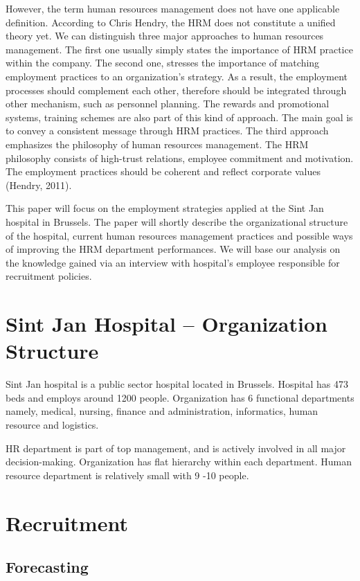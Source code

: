 \documentclass[a4paper,fleqn,11pt,dvips,titlepage]{article}
\numberwithin{figure}{section}
\numberwithin{equation}{section}
\begin{document}
However, the term human resources management does not have one applicable definition.
According to Chris Hendry, the HRM does not constitute a unified theory yet.
We can distinguish three major approaches to human resources management.
The first one usually simply states the importance of HRM practice within the company.
The second one, stresses the importance of matching employment practices to an organization’s strategy.
As a result, the employment processes should complement each other, therefore should be integrated through other mechanism, such as personnel planning.
The rewards and promotional systems, training schemes are also part of this kind of approach.
The main goal is to convey a consistent message through HRM practices.
The third approach emphasizes the philosophy of human resources management.
The HRM philosophy consists of high-trust relations, employee commitment and motivation.
The employment practices should be coherent and reflect corporate values (Hendry, 2011).

This paper will focus on the employment strategies applied at the Sint Jan hospital in Brussels.
The paper will shortly describe the organizational structure of the hospital, current human resources management practices and possible ways of improving the HRM department performances.
We will base our analysis on the knowledge gained via an interview with hospital’s employee responsible for recruitment policies. 


\section{Sint Jan Hospital – Organization Structure}

Sint Jan hospital is a public sector hospital located in Brussels.
Hospital has 473 beds and employs around 1200 people.
Organization has 6 functional departments namely, medical, nursing, finance and administration, informatics, human resource and logistics. 


HR department is part of top management, and is actively involved in all major decision-making.
Organization has flat hierarchy within each department.
Human resource department is relatively small with 9 -10 people.  

\section{Recruitment}

\subsection{Forecasting}
\end{document}

